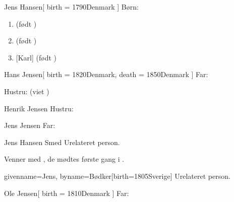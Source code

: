 \documentclass[
	twocolumn
]{article}
\begin{document}
\begin{gprProfile}{Jens Hansen}[
	birth = {1790}{Denmark}
]
	Børn:
	\begin{enumerate}
	\item {} (født )
	\item {} (født )
	\item {}[Karl] (født )
	\end{enumerate}

\end{gprProfile}

\begin{gprProfile}{Hans Jensen}[
	birth = {1820}{Denmark},
	death = {1850}{Denmark}
]
	Far:

	Hustru:
	 (viet )

\end{gprProfile}

\begin{gprProfile}{Henrik Jensen}
	Hustru:
	
	\lipsum[1-6]

\end{gprProfile}

\begin{gprProfile}[id=ABC]{Jens Jensen}
	Far:

\end{gprProfile}

\begin{gprProfile}{Jens Hansen Smed}
	Urelateret person.
	
	Venner med , de mødtes første gang i .

\end{gprProfile}

\begin{gprProfile*}{givenname=Jens, byname=Bødker}[birth={1805}{Sverige}]
	Urelateret person.

\end{gprProfile*}



\begin{gprProfile}{Ole Jensen}[
	birth = {1810}{Denmark}
]
	Far:
\end{gprProfile}

\gprCheckReferences{}

\printindex[gpr-id]
\end{document}
